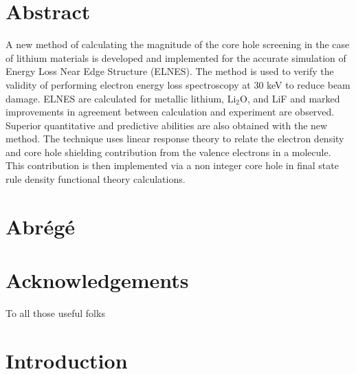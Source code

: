 \documentclass[12pt]{report}
\begin{document}




\tableofcontents




\chapter*{Abstract}
\renewcommand{\thepage}{\roman{page}}%


A new method of calculating the magnitude of the core hole screening in the case of lithium materials is developed and implemented for the accurate simulation of Energy Loss Near Edge Structure (ELNES).  The method is used to verify the validity of performing electron energy loss spectroscopy at 30 keV to reduce beam damage.  ELNES are calculated for metallic lithium, $\mathrm{Li_2O}$, and LiF and marked improvements in agreement between calculation and experiment are observed. Superior quantitative and predictive abilities are also obtained with the new method.   The technique uses linear response theory to relate the electron density and core hole shielding contribution from the valence electrons in a molecule.  This contribution is then implemented via a non integer core hole in final state rule density functional theory calculations.
\\

\chapter*{Abr\'eg\'e}



\chapter*{Acknowledgements}
To all those useful folks







\chapter{Introduction}
\renewcommand{\thepage}{\arabic{page}}%
\setcounter{page}{1}%
\end{document}
